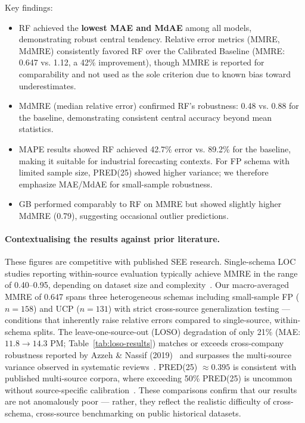 \documentclass{ieeeaccess}
\begin{document}
Key findings:
\begin{itemize}[leftmargin=1.5em]
    \item RF achieved the \textbf{lowest MAE and MdAE} among all models, 
    demonstrating robust central tendency. 
    Relative error metrics (MMRE, MdMRE) consistently favored RF over the Calibrated Baseline 
    (MMRE: 0.647 vs. 1.12, a 42\% improvement), 
    though MMRE is reported for comparability and not used as the sole criterion due to known bias toward underestimates.
    \item MdMRE (median relative error) confirmed RF's robustness: 0.48 vs. 0.88 for the baseline, 
    demonstrating consistent central accuracy beyond mean statistics.
    \item MAPE results showed RF achieved 42.7\% error vs. 89.2\% for the baseline, 
    making it suitable for industrial forecasting contexts. 
    For FP schema with limited sample size, PRED(25) showed higher variance; 
    we therefore emphasize MAE/MdAE for small-sample robustness.
    \item GB performed comparably to RF on MMRE but showed slightly higher MdMRE (0.79), 
    suggesting occasional outlier predictions.
\end{itemize}

\paragraph{Contextualising the results against prior literature.}
These figures are competitive with published SEE research. Single-schema LOC studies reporting within-source evaluation typically achieve MMRE in the range of 0.40--0.95, depending on dataset size and complexity~\cite{wen2012systematic,kocaguneli2013exploiting,minku2013ensembles}. Our macro-averaged MMRE of 0.647 spans three heterogeneous schemas including small-sample FP ($n{=}158$) and UCP ($n{=}131$) with strict cross-source generalization testing --- conditions that inherently raise relative errors compared to single-source, within-schema splits. The leave-one-source-out (LOSO) degradation of only 21\% (MAE: $11.8 \to 14.3$ PM; Table~\ref{tab:loso-results}) matches or exceeds cross-company robustness reported by Azzeh \& Nassif (2019)~\cite{azzeh2019cross} and surpasses the multi-source variance observed in systematic reviews~\cite{wen2012systematic}. PRED(25) $\approx 0.395$ is consistent with published multi-source corpora, where exceeding 50\% PRED(25) is uncommon without source-specific calibration~\cite{pandey2023comprehensive}. These comparisons confirm that our results are not anomalously poor --- rather, they reflect the realistic difficulty of cross-schema, cross-source benchmarking on public historical datasets.
\end{document}
